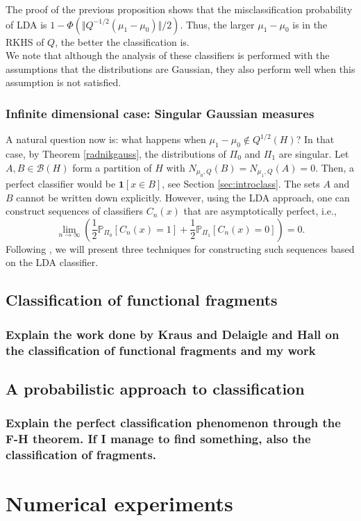 \documentclass[10pt, a4paper]{report}
\newcommand{\Pp}[0]{\mathbb{P}}
\theoremstyle{definition}
\theoremstyle{remark}
\begin{document}
The proof of the previous proposition shows that the misclassification probability of LDA is $1-\Phi\left(\Vert Q^{-1/2}(\mu_1-\mu_0)\Vert/2\right)$. Thus, the larger $\mu_1-\mu_0$ is in the RKHS of $Q$, the better the classification is.\\
We note that although the analysis of these classifiers is performed with the assumptions that the distributions are Gaussian, they also perform well when this assumption is not satisfied. 
\subsection{Infinite dimensional case: Singular Gaussian measures}
A natural question now is: what happens when $\mu_1-\mu_0 \notin Q^{1/2}(H)$? In that case, by Theorem \ref{radnikgauss}, the distributions of $\Pi_0$ and $\Pi_1$ are singular. Let $A,B\in \mathcal{B}(H)$ form a partition of $H$ with $N_{\mu_0,Q}(B)=N_{\mu_1,Q}(A)=0$. Then, a perfect classifier would be $\mathbf{1}[x\in B]$, see Section \ref{sec:introclass}. The sets $A$ and $B$ cannot be written down explicitly. However, using the LDA approach, one can construct sequences of classifiers $C_n(x)$ that are asymptotically perfect, i.e.,
$$\lim_{n\to \infty} \left(\frac{1}{2}\Pp_{\Pi_0}[C_n(x)=1] + \frac{1}{2}\Pp_{\Pi_1}[C_n(x)=0]\right)=0.$$
Following \cite{Kraus2}, we will present three techniques for constructing such sequences based on the LDA classifier.	




\section{Classification of functional fragments}
\subsection{Explain the work done by Kraus and Delaigle and Hall on the classification of functional fragments and my work}
\section{A probabilistic approach to classification}
\subsection{Explain the perfect classification phenomenon through the F-H theorem. If I manage to find something, also the classification of fragments.}

\chapter{Numerical experiments}









 

\end{document}
